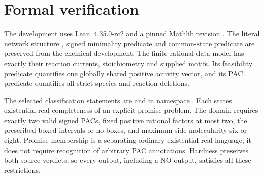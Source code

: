 \documentclass[11pt,a4paper]{article}
\theoremstyle{plain}
\theoremstyle{definition}
\theoremstyle{remark}
\begin{document}
\section{Formal verification}\label{sec:lean}

The development uses Lean~4.35.0-rc2 and a pinned Mathlib revision \citep{demoura2021,mathlib2020}. The literal network structure , signed minimality predicate  and common-state predicate  are preserved from the chemical development. The finite rational data model has exactly their reaction currents, stoichiometry and supplied motifs. Its feasibility predicate quantifies one globally shared positive activity vector, and its PAC predicate quantifies all strict species and reaction deletions.

The selected classification statements are  and  in namespace . Each states existential-real completeness of an explicit promise problem. The domain requires exactly two valid signed PACs, fixed positive rational factors at most two, the prescribed boxed intervals or no boxes, and maximum side molecularity six or eight. Promise membership is a separating ordinary existential-real language; it does not require recognition of arbitrary PAC annotations. Hardness preserves both source verdicts, so every output, including a NO output, satisfies all these restrictions.
\end{document}
